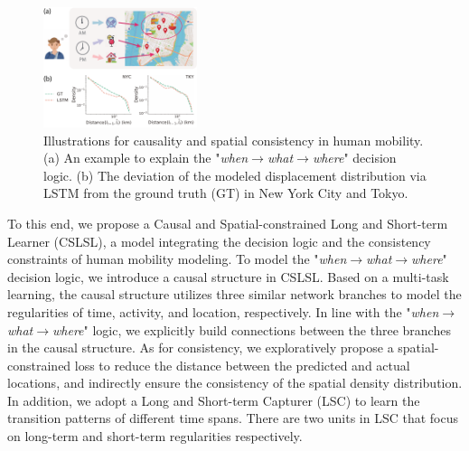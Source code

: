 \documentclass[sigconf]{acmart}
\begin{document}
    \begin{figure}[bt]
        \begin{center}
        \includegraphics[width=0.4\textwidth]{figure/motivation.pdf}
        \end{center}
        \caption{Illustrations for causality and spatial consistency in human mobility. (a) An example to explain the "\textit{when$\rightarrow$what$\rightarrow$where}" decision logic. (b) The deviation of the modeled displacement distribution via LSTM from the ground truth (GT) in New York City and Tokyo.}
        \label{fig:motivation}
    \end{figure}
    
    To this end, we propose a Causal and Spatial-constrained Long and Short-term Learner (CSLSL), a model integrating the decision logic and the consistency constraints of human mobility modeling.
    To model the "\textit{when$\rightarrow$what$\rightarrow$where}" decision logic, we introduce a causal structure in CSLSL. Based on a multi-task learning, the causal structure utilizes three similar network branches to model the regularities of time, activity, and location, respectively. 
    In line with the "\textit{when$\rightarrow$what$\rightarrow$where}" logic, we explicitly build connections between the three branches in the causal structure.
    As for consistency, we exploratively propose a spatial-constrained loss to reduce the distance between the predicted and actual locations, and indirectly ensure the consistency of the spatial density distribution. In addition, we adopt a Long and Short-term Capturer (LSC) to learn the transition patterns of different time spans. There are two units in LSC that focus on long-term and short-term regularities respectively. 
    
\end{document}
